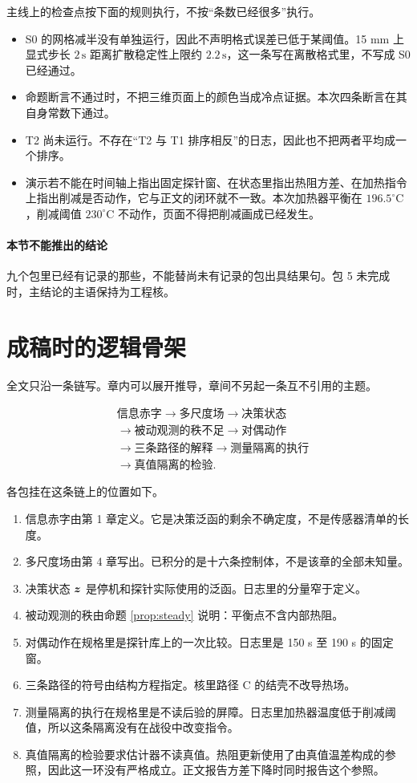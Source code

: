 主线上的检查点按下面的规则执行，不按“条数已经很多”执行。

\begin{itemize}
\item S0 的网格减半没有单独运行，因此不声明格式误差已低于某阈值。15 mm 上显式步长 \(2\,\mathrm{s}\) 距离扩散稳定性上限约 \(2.2\,\mathrm{s}\)，这一条写在离散格式里，不写成 S0 已经通过。
\item 命题断言不通过时，不把三维页面上的颜色当成冷点证据。本次四条断言在其自身常数下通过。
\item T2 尚未运行。不存在“T2 与 T1 排序相反”的日志，因此也不把两者平均成一个排序。
\item 演示若不能在时间轴上指出固定探针窗、在状态里指出热阻方差、在加热指令上指出削减是否动作，它与正文的闭环就不一致。本次加热器平衡在 \(196.5^\circ\mathrm{C}\)，削减阈值 \(230^\circ\mathrm{C}\) 不动作，页面不得把削减画成已经发生。
\end{itemize}

\paragraph{本节不能推出的结论}
九个包里已经有记录的那些，不能替尚未有记录的包出具结果句。包 5 未完成时，主结论的主语保持为工程核。

\section{成稿时的逻辑骨架}

全文只沿一条链写。章内可以展开推导，章间不另起一条互不引用的主题。

\[
\begin{aligned}
&\text{信息赤字}
\to\text{多尺度场}
\to\text{决策状态}\\
&\to\text{被动观测的秩不足}
\to\text{对偶动作}\\
&\to\text{三条路径的解释}
\to\text{测量隔离的执行}\\
&\to\text{真值隔离的检验}.
\end{aligned}
\]

各包挂在这条链上的位置如下。

\begin{enumerate}
\item 信息赤字由第 1 章定义。它是决策泛函的剩余不确定度，不是传感器清单的长度。
\item 多尺度场由第 4 章写出。已积分的是十六条控制体，不是该章的全部未知量。
\item 决策状态 \(\bm{z}\) 是停机和探针实际使用的泛函。日志里的分量窄于定义。
\item 被动观测的秩由命题 \ref{prop:steady} 说明：平衡点不含内部热阻。
\item 对偶动作在规格里是探针库上的一次比较。日志里是 150 s 至 190 s 的固定窗。
\item 三条路径的符号由结构方程指定。核里路径 C 的结壳不改导热场。
\item 测量隔离的执行在规格里是不读后验的屏障。日志里加热器温度低于削减阈值，所以这条隔离没有在战役中改变指令。
\item 真值隔离的检验要求估计器不读真值。热阻更新使用了由真值温差构成的参照，因此这一环没有严格成立。正文报告方差下降时同时报告这个参照。
\end{enumerate}

